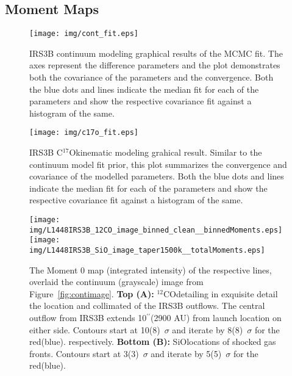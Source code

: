 \documentclass[preprint,12pt]{aastex62}
\newcommand{\cso}{C$^{17}$O}
\newcommand{\co}{$^{12}$CO}
\newcommand{\sio}{SiO}
\renewcommand{\arcsec}{$^{\prime\prime}$}
\begin{document}
\subsection*{Moment Maps}\label{sec:momentmaps}
\begin{figure}[H]
\begin{center}
\texttt{[image: img/cont\_fit.eps]}
\end{center}
\caption{IRS3B continuum modeling graphical results of the MCMC fit. The axes represent the difference parameters and the plot demonstrates both the covariance of the parameters and the convergence. Both the blue dots and lines indicate the median fit for each of the parameters and show the respective covariance fit against a histogram of the same.}\label{fig:stairstep_cont}
\end{figure}
\newpage
\begin{figure}[H]
\begin{center}
\texttt{[image: img/c17o\_fit.eps]}
\end{center}
\caption{IRS3B \cso\space kinematic modeling grahical result. Similar to the continuum model fit prior, this plot summarizes the convergence and covariance of the modelled parameters. Both the blue dots and lines indicate the median fit for each of the parameters and show the respective covariance fit against a histogram of the same.}\label{fig:stairstep_c17o}
\end{figure}
\newpage
\begin{figure}[H]
   \begin{center}
   \texttt{[image: img/L1448IRS3B\_12CO\_image\_binned\_clean\_\_binnedMoments.eps]} %
   \texttt{[image: img/L1448IRS3B\_SiO\_image\_taper1500k\_\_totalMoments.eps]}
   \end{center}
   \vspace{-0.25cm}\caption{ The Moment 0 map (integrated intensity) of the respective lines, overlaid the continuum (grayscale) image from Figure~\ref{fig:contimage}. 
   \textbf{Top (A):} \co\space detailing in exquisite detail the location and collimated of the IRS3B outflows. The central outflow from IRS3B extends 10\arcsec\space(2900 AU) from launch location on either side. Contours start at 10(8)~$\sigma$ and iterate by 8(8)~$\sigma$ for the red(blue). respectively. 
   \textbf{Bottom (B):} \sio\space locations of shocked gas fronts. Contours start at 3(3)~$\sigma$ and iterate by 5(5)~$\sigma$ for the red(blue).}\label{fig:momentmap}
\end{figure}
\end{document}
